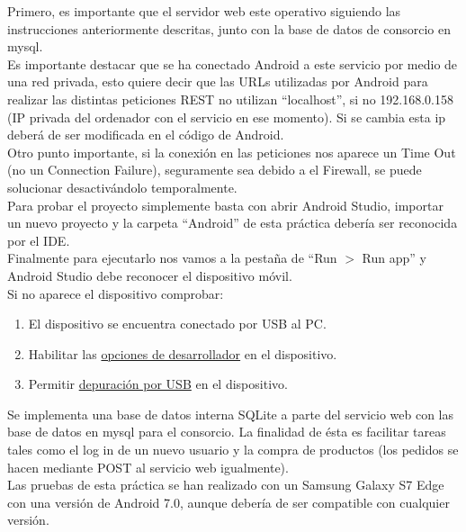 \documentclass[a4paper,12pt,oneside]{article}
\begin{document}
Primero, es importante que el servidor web este operativo siguiendo las instrucciones anteriormente descritas, junto con la base de datos de consorcio en mysql.\\

Es importante destacar que se ha conectado Android a este servicio por medio de una red privada, esto quiere decir que las URLs utilizadas por Android para realizar las distintas peticiones REST no utilizan ``localhost'', si no 192.168.0.158 (IP privada del ordenador con el servicio en ese momento). Si se cambia esta ip deberá de ser modificada en el código de Android.\\

Otro punto importante, si la conexión en las peticiones nos aparece un Time Out (no un Connection Failure), seguramente sea debido a el Firewall, se puede solucionar desactivándolo temporalmente.\\

Para probar el proyecto simplemente basta con abrir Android Studio, importar un nuevo proyecto y la carpeta ``Android'' de esta práctica debería ser reconocida por el IDE. \\

Finalmente para ejecutarlo nos vamos a la pestaña de ``Run $>$ Run app'' y Android Studio debe reconocer el dispositivo móvil. \\

Si no aparece el dispositivo comprobar:

\begin{enumerate}
	\item El dispositivo se encuentra conectado por USB al PC.
	\item Habilitar las \href{https://www.xatakandroid.com/sistema-operativo/opciones-de-desarrollo-de-android-para-que-sirven-y-cuales-deberiamos-activar}{opciones de desarrollador} en el dispositivo.
	\item Permitir \href{https://androidstudiofaqs.com/tutoriales/android-studio-no-reconoce-movil-solucion}{depuración por USB} en el dispositivo.
\end{enumerate}

Se implementa una base de datos interna SQLite a parte del servicio web con las base de datos en mysql para el consorcio. La finalidad de ésta es facilitar tareas tales como el log in de un nuevo usuario y la compra de productos (los pedidos se hacen mediante POST al servicio web igualmente). \\

Las pruebas de esta práctica se han realizado con un Samsung Galaxy S7 Edge con una versión de Android 7.0, aunque debería de ser compatible con cualquier versión.
\end{document}
